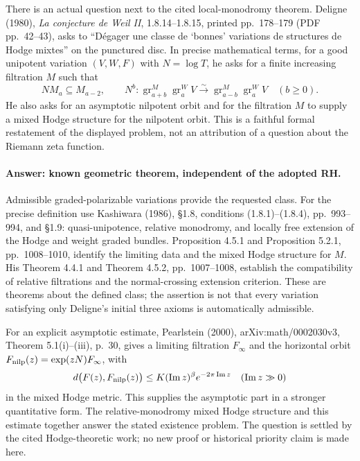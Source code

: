 \documentclass[11pt,a4paper]{article}
\theoremstyle{definition}\newtheorem{definition}[theorem]{Definition}
\theoremstyle{remark}\newtheorem{remark}[theorem]{Remark}
\begin{document}
There is an actual question next to the cited local-monodromy theorem.
Deligne (1980), \emph{La conjecture de Weil II}, 1.8.14--1.8.15,
printed pp.~178--179 (PDF pp.~42--43), asks to
``D\'egager une classe de `bonnes' variations de structures de Hodge mixtes''
on the punctured disc. In precise mathematical terms, for a good
unipotent variation $(V,W,F)$ with $N=\log T$, he asks for a finite
increasing filtration $M$ such that
\[
 NM_a\subseteq M_{a-2},\qquad
 N^b:\operatorname{gr}^{M}_{a+b}\operatorname{gr}^{W}_a V
       \xrightarrow{\sim}
       \operatorname{gr}^{M}_{a-b}\operatorname{gr}^{W}_a V
 \quad(b\geq0).
\]
He also asks for an asymptotic nilpotent orbit and for the filtration
$M$ to supply a mixed Hodge structure for the nilpotent orbit.
This is a faithful formal restatement of the displayed problem, not
an attribution of a question about the Riemann zeta function.

\paragraph{Answer: known geometric theorem, independent of the adopted RH.}
Admissible graded-polarizable variations provide the requested class.
For the precise definition use Kashiwara (1986), \S1.8,
conditions (1.8.1)--(1.8.4), pp.~993--994, and \S1.9: quasi-unipotence,
relative monodromy, and locally free extension of the Hodge and weight
graded bundles. Proposition 4.5.1 and Proposition 5.2.1,
pp.~1008--1010, identify the limiting data and the mixed Hodge
structure for $M$. His Theorem 4.4.1 and Theorem 4.5.2,
pp.~1007--1008, establish the compatibility of relative filtrations
and the normal-crossing extension criterion. These are theorems about
the defined class; the assertion is not that every variation satisfying
only Deligne's initial three axioms is automatically admissible.

For an explicit asymptotic estimate, Pearlstein (2000),
arXiv:math/0002030v3, Theorem 5.1(i)--(iii), p.~30,
gives a limiting filtration $F_\infty$ and the horizontal orbit
$F_{\rm nilp}(z)=\exp(zN)F_\infty$, with
\[
 d\bigl(F(z),F_{\rm nilp}(z)\bigr)
 \leq K(\operatorname{Im}z)^\beta
                  e^{-2\pi\operatorname{Im}z}
 \quad(\operatorname{Im}z\gg0)
\]
in the mixed Hodge metric. This supplies the asymptotic part in a
stronger quantitative form. The relative-monodromy mixed Hodge
structure and this estimate together answer the stated existence
problem. The question is settled by the cited Hodge-theoretic work;
no new proof or historical priority claim is made here.
\end{document}
